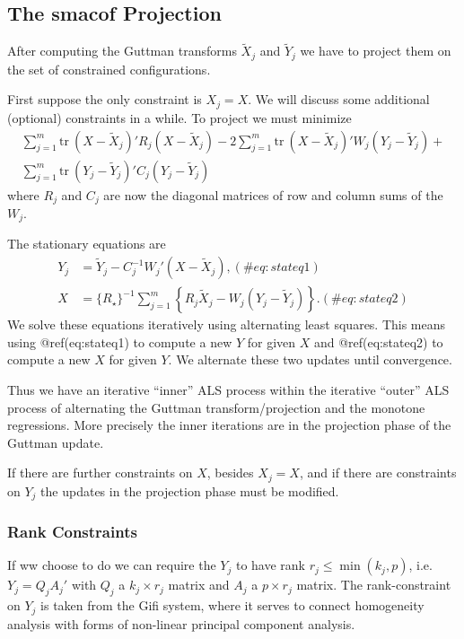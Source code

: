 \documentclass[
  12pt,
  letterpaper,
  DIV=11,
  numbers=noendperiod]{scrartcl}
\begin{document}
\subsection{The smacof Projection}\label{the-smacof-projection}

After computing the Guttman transforms \(\tilde X_j\) and \(\tilde Y_j\)
we have to project them on the set of constrained configurations.

First suppose the only constraint is \(X_j=X\). We will discuss some
additional (optional) constraints in a while. To project we must
minimize \begin{multline}
\sum_{j=1}^m\text{tr}\ (X-\tilde X_j)'R_j(X-\tilde X_j)-2\sum_{j=1}^m\text{tr}\ (X-\tilde X_j)'W_j(Y_j-\tilde Y_j)+\\
\sum_{j=1}^m\text{tr}\ (Y_j-\tilde Y_j)'C_j(Y_j-\tilde Y_j)
\end{multline} where \(R_j\) and \(C_j\) are now the diagonal matrices
of row and column sums of the \(W_j\).

The stationary equations are \begin{align}
Y_j&=\tilde Y_j-C_j^{-1}W_j'(X-\tilde X_j),(\#eq:stateq1)\\
X&=\{R_\star\}^{-1}\sum_{j=1}^m\left\{R_j\tilde X_j-W_j(Y_j-\tilde Y_j)\right\}.(\#eq:stateq2)
\end{align} We solve these equations iteratively using alternating least
squares. This means using @ref(eq:stateq1) to compute a new \(Y\) for
given \(X\) and @ref(eq:stateq2) to compute a new \(X\) for given \(Y\).
We alternate these two updates until convergence.

Thus we have an iterative ``inner'' ALS process within the iterative
``outer'' ALS process of alternating the Guttman transform/projection
and the monotone regressions. More precisely the inner iterations are in
the projection phase of the Guttman update.

If there are further constraints on \(X\), besides \(X_j=X\), and if
there are constraints on \(Y_j\) the updates in the projection phase
must be modified.

\subsubsection{Rank Constraints}\label{rank-constraints}

If ww choose to do we can require the \(Y_j\) to have rank
\(r_j\leq\min(k_j,p)\), i.e.~\(Y_j=Q_jA_j'\) with \(Q_j\) a
\(k_j\times r_j\) matrix and \(A_j\) a \(p\times r_j\) matrix. The
rank-constraint on \(Y_j\) is taken from the Gifi system, where it
serves to connect homogeneity analysis with forms of non-linear
principal component analysis.
\end{document}

